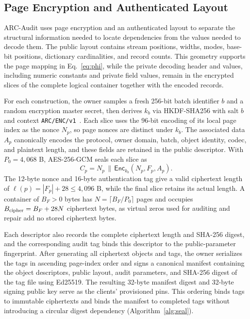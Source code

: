 \documentclass[10pt,journal]{IEEEtran}
\begin{document}
\subsection{Page Encryption and Authenticated Layout}\label{sec:seal}
ARC-Audit uses page encryption and an authenticated layout to separate the structural information needed to locate dependencies from the values needed to decode them. The public layout contains stream positions, widths, modes, base-bit positions, dictionary cardinalities, and record counts. This geometry supports the page mapping in Eq.~\eqref{eq:phi}, while the private decoding header and values, including numeric constants and private field values, remain in the encrypted slices of the complete logical container together with the encoded records.

For each construction, the owner samples a fresh 256-bit batch identifier
$b$ and a random encryption master secret, then derives $k_b$ via HKDF-SHA256 with
salt $b$ and context \texttt{ARC/ENC/v1}~\cite{RFC5869}.
Each slice uses the 96-bit encoding of its local page index as the nonce $N_p$, so page nonces are distinct under $k_b$. The associated data $A_p$ canonically encodes the protocol, owner domain, batch, object identity, codec, and plaintext length, and these fields are retained in the public descriptor. With $P_0=4{,}068$ B, AES-256-GCM seals each slice as~\cite{RFC5116}
\begin{equation}\label{eq:cipher}
C_p=N_p\,\|\,\mathsf{Enc}_{k_b}(N_p,F_p,A_p).
\end{equation}
The 12-byte nonce and 16-byte authentication tag give a valid ciphertext length of $\ell(p)=|F_p|+28\leq4{,}096$ B, while the final slice retains its actual length. A container of $B_F>0$ bytes has $N=\lceil B_F/P_0\rceil$ pages and occupies $B_{\rm cipher}=B_F+28N$ ciphertext bytes, as virtual zeros used for auditing and repair add no stored ciphertext bytes.

Each descriptor also records the complete ciphertext length and SHA-256 digest, and the corresponding audit tag binds this descriptor to the public-parameter fingerprint. After generating all ciphertext objects and tags, the owner serializes the tags in ascending page-index order and signs a canonical manifest containing the object descriptors, public layout, audit parameters, and SHA-256 digest of the tag file using Ed25519. The resulting 32-byte manifest digest and 32-byte signing public key serve as the clients' provisioned pins. This ordering binds tags to immutable ciphertexts and binds the manifest to completed tags without introducing a circular digest dependency (Algorithm~\ref{alg:seal}).
\end{document}
